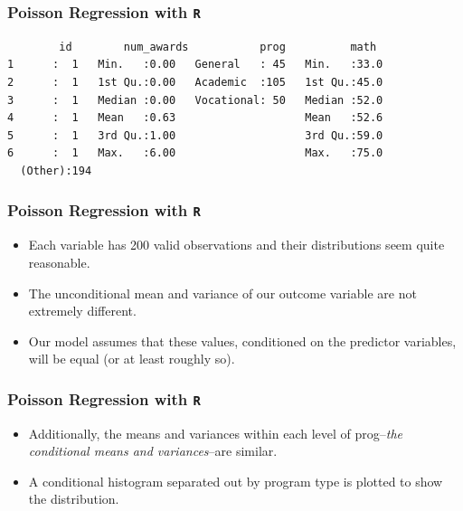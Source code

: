 \documentclass[00-GLMregslides.tex]{subfiles}
\begin{document}
\begin{frame}[fragile]
	
\frametitle{Poisson Regression with \texttt{R}}
\normalsize
	\begin{verbatim}
        id        num_awards           prog          math     
1      :  1   Min.   :0.00   General   : 45   Min.   :33.0  
2      :  1   1st Qu.:0.00   Academic  :105   1st Qu.:45.0  
3      :  1   Median :0.00   Vocational: 50   Median :52.0  
4      :  1   Mean   :0.63                    Mean   :52.6  
5      :  1   3rd Qu.:1.00                    3rd Qu.:59.0  
6      :  1   Max.   :6.00                    Max.   :75.0  
  (Other):194
\end{verbatim}
\end{frame}

\begin{frame}[fragile]

\frametitle{Poisson Regression with \texttt{R}}
\Large

\begin{itemize}
\item Each variable has 200 valid observations and their distributions seem quite reasonable. 
\item The unconditional mean and variance of our outcome variable are not extremely different. 
\item Our model assumes that these values, conditioned on the predictor variables, will be equal (or at least roughly so).
\end{itemize}
\end{frame}
\begin{frame}[fragile]
\frametitle{Poisson Regression with \texttt{R}}
\Large
\begin{itemize}
\item Additionally, the means and variances within each level of prog--\textit{the conditional means and variances}--are similar. 
\item A conditional histogram separated out by program type is plotted to show the distribution.
\end{itemize}


\end{frame}
\end{document}

